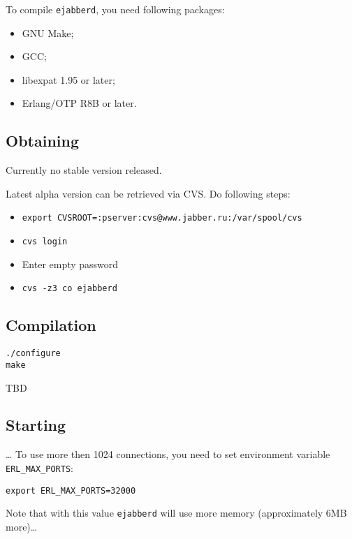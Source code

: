 \documentclass[10pt]{article}
\newcommand{\ejabberd}{\texttt{ejabberd}}
\begin{document}
To compile \ejabberd{}, you need following packages:
\begin{itemize}
\item GNU Make;
\item GCC;
\item libexpat 1.95 or later;
\item Erlang/OTP R8B or later.
\end{itemize}

\subsection{Obtaining}
\label{sec:obtaining}

Currently no stable version released.

Latest alpha version can be retrieved via CVS\@.  Do following steps:
\begin{itemize}
\item \texttt{export CVSROOT=:pserver:cvs@www.jabber.ru:/var/spool/cvs}
\item \texttt{cvs login}
\item Enter empty password
\item \texttt{cvs -z3 co ejabberd}
\end{itemize}






\subsection{Compilation}
\label{sec:compilation}

\begin{verbatim}
./configure
make
\end{verbatim}

TBD





\subsection{Starting}
\label{sec:starting}

\ldots{} To use more then 1024 connections, you need to set environment
variable \texttt{ERL\_MAX\_PORTS}:
\begin{verbatim}
export ERL_MAX_PORTS=32000
\end{verbatim}
Note that with this value \ejabberd{} will use more memory (approximately 6MB
more)\ldots{}
\end{document}
